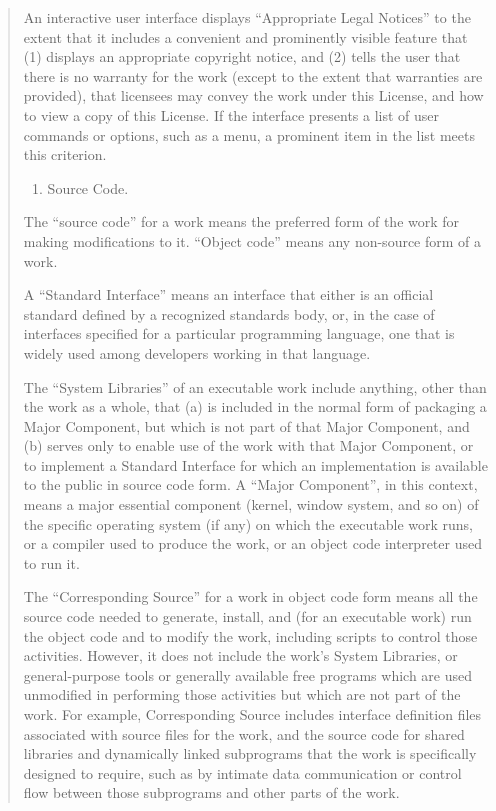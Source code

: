 \documentclass[letterpaper,10pt,english]{sphinxmanual}
\begin{document}
\begin{quote}
An interactive user interface displays ``Appropriate Legal Notices''
to the extent that it includes a convenient and prominently visible
feature that (1) displays an appropriate copyright notice, and (2)
tells the user that there is no warranty for the work (except to the
extent that warranties are provided), that licensees may convey the
work under this License, and how to view a copy of this License.  If
the interface presents a list of user commands or options, such as a
menu, a prominent item in the list meets this criterion.
\begin{enumerate}
\item {} 
Source Code.

\end{enumerate}

The ``source code'' for a work means the preferred form of the work
for making modifications to it.  ``Object code'' means any non-source
form of a work.

A ``Standard Interface'' means an interface that either is an official
standard defined by a recognized standards body, or, in the case of
interfaces specified for a particular programming language, one that
is widely used among developers working in that language.

The ``System Libraries'' of an executable work include anything, other
than the work as a whole, that (a) is included in the normal form of
packaging a Major Component, but which is not part of that Major
Component, and (b) serves only to enable use of the work with that
Major Component, or to implement a Standard Interface for which an
implementation is available to the public in source code form.  A
``Major Component'', in this context, means a major essential component
(kernel, window system, and so on) of the specific operating system
(if any) on which the executable work runs, or a compiler used to
produce the work, or an object code interpreter used to run it.

The ``Corresponding Source'' for a work in object code form means all
the source code needed to generate, install, and (for an executable
work) run the object code and to modify the work, including scripts to
control those activities.  However, it does not include the work's
System Libraries, or general-purpose tools or generally available free
programs which are used unmodified in performing those activities but
which are not part of the work.  For example, Corresponding Source
includes interface definition files associated with source files for
the work, and the source code for shared libraries and dynamically
linked subprograms that the work is specifically designed to require,
such as by intimate data communication or control flow between those
subprograms and other parts of the work.


\end{quote}
\end{document}
